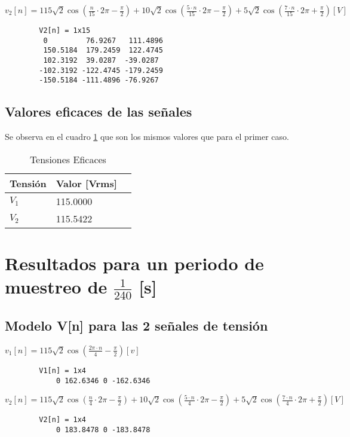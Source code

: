 \documentclass[conference]{IEEEtran}
\theoremstyle{mytheoremstyle}
\theoremstyle{mytheoremstyle}
\theoremstyle{myproblemstyle}
\begin{document}
        $v_2[n] = 115\sqrt{2} \cos(\frac{n}{15}\cdot 2\pi- \frac{\pi}{2}) + 10 \sqrt{2} \cos(\frac{5 \cdot n}{15}\cdot 2\pi - \frac{\pi}{2}) + 5 \sqrt{2} \cos(\frac{7 \cdot n}{15}\cdot 2\pi + \frac{\pi}{2}) [V]$
        \begin{verbatim}
        V2[n] = 1x15    
         0         76.9267   111.4896  
         150.5184  179.2459  122.4745  
         102.3192  39.0287  -39.0287 
        -102.3192 -122.4745 -179.2459 
        -150.5184 -111.4896 -76.9267
        \end{verbatim}

        \subsection{Valores eficaces de las señales}
        Se observa en el cuadro \ref{tab:tensiones1} que son los mismos valores que para el primer caso.
        \begin{table}[h]
            \centering
            \caption{Tensiones Eficaces}
            \begin{tabular}{@{}lll@{}}
            \toprule
            Tensión & Valor [Vrms] \\ \midrule
            $V_1$   & 115.0000     \\
            $V_2$   & 115.5422     \\ \bottomrule
            \end{tabular}
            \label{tab:tensiones1}
        \end{table}



        \section{Resultados para un periodo de muestreo de \texorpdfstring{$\frac{1}{240}$}{1/240} [s]}        
        \subsection{Modelo V[n] para las 2 señales de tensión}
        $v_1[n] = 115\sqrt{2} \cos(\frac{2\pi \cdot n}{4}   - \frac{\pi}{2}) [v]$
        \begin{verbatim}
        V1[n] = 1x4    
            0 162.6346 0 -162.6346
        \end{verbatim}
        
        
        $v_2[n] = 115\sqrt{2} \cos(\frac{n}{4}\cdot 2\pi- \frac{\pi}{2}) + 10 \sqrt{2} \cos(\frac{5 \cdot n}{4}\cdot 2\pi - \frac{\pi}{2}) + 5 \sqrt{2} \cos(\frac{7 \cdot n}{4}\cdot 2\pi + \frac{\pi}{2}) [V]$
        \begin{verbatim}
        V2[n] = 1x4   
            0 183.8478 0 -183.8478
        \end{verbatim}
        
\end{document}
